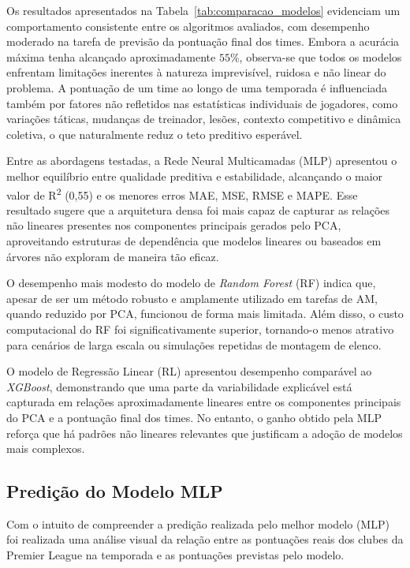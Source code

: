 Os resultados apresentados na Tabela~\ref{tab:comparacao_modelos} evidenciam um comportamento consistente entre os algoritmos avaliados, com desempenho
moderado na tarefa de previsão da pontuação final dos times. Embora a acurácia máxima tenha alcançado aproximadamente $55\%$, observa-se que todos os modelos
enfrentam limitações inerentes à natureza imprevisível, ruidosa e não linear do problema. A pontuação de um time ao longo de uma temporada é influenciada também
por fatores não refletidos nas estatísticas individuais de jogadores, como variações táticas, mudanças de treinador, lesões, contexto competitivo e dinâmica
coletiva, o que naturalmente reduz o teto preditivo esperável.

Entre as abordagens testadas, a Rede Neural Multicamadas (MLP) apresentou o melhor equilíbrio entre qualidade preditiva e estabilidade, alcançando o maior valor de
R\textsuperscript{2} (0{,}55) e os menores erros MAE, MSE, RMSE e MAPE. Esse resultado sugere que a arquitetura densa foi mais capaz de capturar as relações não lineares
presentes nos componentes principais gerados pelo PCA, aproveitando estruturas de dependência que modelos lineares ou baseados em árvores não exploram de maneira tão eficaz.

O desempenho mais modesto do modelo de \textit{Random Forest} (RF) indica que, apesar de ser um método robusto e amplamente utilizado em tarefas de
AM, quando reduzido por PCA, funcionou de forma mais limitada. Além disso, o custo computacional do RF foi significativamente superior, tornando-o menos atrativo para 
cenários de larga escala ou simulações repetidas de montagem de elenco.

O modelo de Regressão Linear (RL) apresentou desempenho comparável ao \textit{XGBoost}, demonstrando que uma parte da variabilidade explicável está capturada em relações
aproximadamente lineares entre os componentes principais do PCA e a pontuação final dos times. No entanto, o ganho obtido pela MLP reforça que há padrões 
não lineares relevantes que justificam a adoção de modelos mais complexos.

\subsection{Predição do Modelo MLP}

Com o intuito de compreender a predição realizada pelo melhor modelo (MLP) foi realizada uma análise visual da relação entre as pontuações reais dos clubes da Premier League
na temporada e as pontuações previstas pelo modelo. 

